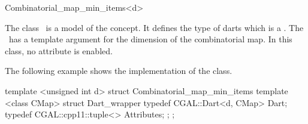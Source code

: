 \ccRefPageBegin

\begin{ccRefClass}{Combinatorial_map_min_items<d>}


\ccDefinition
  
The class \ccRefName\ is a model of the 
concept. It defines the type of darts which is a
.  The \ccRefName\ has a
template argument for the dimension of the combinatorial map.
In this class, no attribute is enabled.

\ccIsModel
{}

\ccExample

The following example shows the implementation of the
 class.

\begin{ccExampleCode}
template <unsigned int d>
struct Combinatorial_map_min_items
{
   template <class CMap>
   struct Dart_wrapper
   {
     typedef CGAL::Dart<d, CMap> Dart;
     typedef CGAL::cpp11::tuple<> Attributes;
   };
};
\end{ccExampleCode}

\ccSeeAlso
{}\\


\end{ccRefClass}

\ccRefPageEnd
